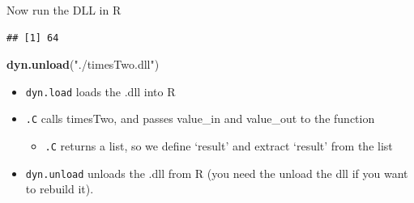 \documentclass[ignorenonframetext,]{beamer}
\newenvironment{Shaded}{\begin{snugshade}}{\end{snugshade}}
\newcommand{\KeywordTok}[1]{\textcolor[rgb]{0.13,0.29,0.53}{\textbf{{#1}}}}
\newcommand{\DataTypeTok}[1]{\textcolor[rgb]{0.13,0.29,0.53}{{#1}}}
\newcommand{\DecValTok}[1]{\textcolor[rgb]{0.00,0.00,0.81}{{#1}}}
\newcommand{\StringTok}[1]{\textcolor[rgb]{0.31,0.60,0.02}{{#1}}}
\newcommand{\NormalTok}[1]{{#1}}
\providecommand{\tightlist}{%
\setlength{\itemsep}{0pt}\setlength{\parskip}{0pt}}
\begin{document}
\begin{frame}[fragile]{Now run the DLL in R}

\begin{Shaded}
\end{Shaded}

\begin{verbatim}
## [1] 64
\end{verbatim}

\begin{Shaded}
\begin{Highlighting}[]
\KeywordTok{dyn.unload}\NormalTok{(}\StringTok{"./timesTwo.dll"}\NormalTok{)}
\end{Highlighting}
\end{Shaded}

\begin{itemize}
\tightlist
\item
  \texttt{dyn.load} loads the .dll into R
\item
  \texttt{.C} calls timesTwo, and passes value\_in and value\_out to the
  function

  \begin{itemize}
  \tightlist
  \item
    \texttt{.C} returns a list, so we define `result' and extract
    `result' from the list
  \end{itemize}
\item
  \texttt{dyn.unload} unloads the .dll from R (you need the unload the
  dll if you want to rebuild it).
\end{itemize}

\end{frame}
\end{document}
